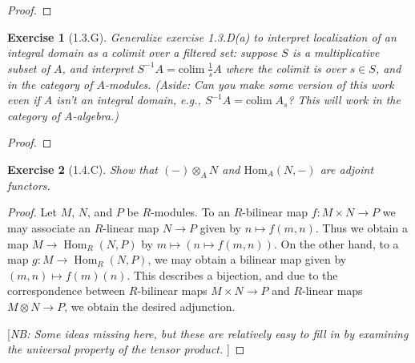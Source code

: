 \documentclass{amsart}
\newtheorem*{exercise*}{Exercise}
\newcommand{\colim}{\mathrm{colim}}
\begin{document}
\vspace{0.1in}

\begin{proof}
	
\end{proof}

\vspace{0.1in}


\begin{exercise*}[1.3.G]
    Generalize exercise 1.3.D(a) to interpret localization of an integral domain as a colimit over a filtered set: suppose $S$ is a multiplicative subset of $A$, and interpret $S^{-1}A=\colim\;\frac{1}{s}A$ where the colimit is over $s\in S$, and in the category of $A$-modules. (Aside: Can you make some version of this work even if $A$ isn't an integral domain, e.g., $S^{-1}A=\colim\;A_s$? This will work in the category of $A$-algebra.)
\end{exercise*}

\vspace{0.1in}

\begin{proof}
	
\end{proof}

\vspace{0.1in}


\begin{exercise*}[1.4.C]
    Show that $(-)\otimes_A N$ and $\mathrm{Hom}_A(N, -)$ are adjoint functors. 
\end{exercise*}

\begin{proof}
    Let $M$, $N$, and $P$ be $R$-modules.  To an $R$-bilinear map $f: M \times N \to P$ we may associate
    an $R$-linear map $N \to P$ given by $n \mapsto f (m, n)$. Thus we obtain a map
    $M \to \operatorname{Hom}_R(N, P)$ by $m \mapsto (n \mapsto f(m, n))$. On the other hand, to a map
    $g: M \to \operatorname{Hom}_R(N, P)$, we may obtain a bilinear map given by $(m, n) \mapsto f(m)(n)$.
    This describes a bijection, and due to the correspondence between $R$-bilinear maps $M \times N \to P$
    and $R$-linear maps $M \otimes N \to P$, we obtain the desired adjunction.
    
    [\textit{NB: Some ideas missing here, but these are relatively easy to fill in by examining the universal property of the tensor product. }]
\end{proof}
\end{document}
